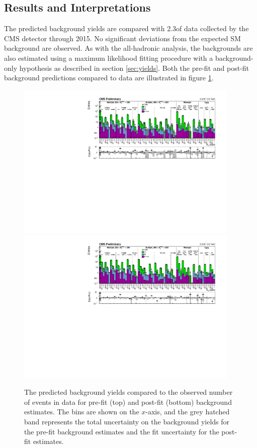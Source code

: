 \subsection{Results and Interpretations}
\label{subsec:softresults}

The predicted background yields are compared with 2.3\fbinv of data collected by the CMS detector through 2015.  No significant deviations from the expected SM background are observed. As with the all-hadronic analysis, the backgrounds are also estimated using a maximum likelihood fitting procedure with a background-only hypothesis as described in section \ref{sec:yields}. Both the pre-fit and post-fit background predictions compared to data are illustrated in figure \ref{fig:softresults}.
\begin{figure}
	\centering
	\includegraphics[width=0.95\textwidth]{soft/figs/c_DataVsPrediction_Syst_log}
	\includegraphics[width=0.95\textwidth]{soft/figs/c_DataVsPostFitEstimates_log}
	\caption{The predicted background yields compared to the observed number of events in data for pre-fit (top) and post-fit (bottom) background estimates. The \mt bins are shown on the $x$-axis, and the grey hatched band represents the total uncertainty on the background yields for the pre-fit background estimates and the fit uncertainty for the post-fit estimates.}
	\label{fig:softresults}
\end{figure}

